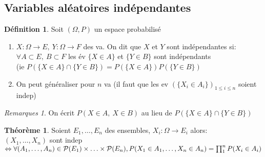 \documentclass[fleqn]{article}
\theoremstyle{definition} \newtheorem*{defi}{D\'efinition}
\theoremstyle{definition} \newtheorem*{theo}{Th\'eor\`eme}
\theoremstyle{definition} \newtheorem*{coro}{Corollaire}
\theoremstyle{remark} \newtheorem*{rqs}{Remarques}
\theoremstyle{definition} \newtheorem*{prop}{Propri\'et\'e}
\begin{document}
\subsection{Variables al\'eatoires ind\'ependantes}
\begin{defi} Soit $(\Omega, P)$ un espace probabilis\'e
	\begin{enumerate}
		\item $X: \Omega \rightarrow E,\ Y: \Omega \rightarrow F$ des va. On dit que $X$ et $Y$ sont ind\'ependantes si:\\ $\forall A \subset E,\
		B \subset F$ les \'ev $\{X \in A\}$ et $\{Y \in B\}$ sont ind\'ependants \\(ie $P(\{X\in A\} \cap \{Y \in B\}) = P(\{X\in A\})
		P(\{Y \in B\})$
		\item On peut g\'en\'eraliser pour $n$ va (il faut que les ev $(\{X_i \in A_i\})_{1\leq i \leq n}$ soient indep)
	\end{enumerate}
	\begin{rqs}
			On \'ecrit $P(X \in A,\ X \in B)$ au lieu de $P(\{X \in A\} \cap \{Y \in B\})$
	\end{rqs}
\end{defi}

\begin{theo}
	Soient $E_1, \hdots, E_n$ des ensembles, $X_i: \Omega \rightarrow E_i$ alors:\\
	$(X_1, \hdots, X_n)$ sont indep $\Leftrightarrow \forall (A_1, \hdots, A_n) \in \mathcal{P}(E_1) \times \hdots \times \mathcal{P}(E_n),\\
	P(X_1 \in A_1, \hdots, X_n \in A_n) = \prod_1^n P(X_i \in A_i)$
\end{theo}
\end{document}
